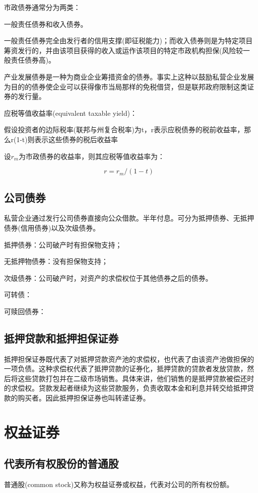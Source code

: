 \documentclass{article}
\begin{document}
市政债券通常分为两类：

一般责任债券和收入债券。

一般责任债券完全由发行者的信用支撑(即征税能力)；而收入债券则是为特定项目筹资发行的，并由该项目获得的收入或运作该项目的特定市政机构担保(风险较一般责任债券高)。

产业发展债券是一种为商业企业筹措资金的债券。事实上这种以鼓励私营企业发展为目的的债券使企业可以获得像市当局那样的免税借贷，但是联邦政府限制这类证券的发行量。

\hspace*{\fill}

应税等值收益率(equivalent taxable yield)：

假设投资者的边际税率(联邦与州复合税率)为t，r表示应税债券的税前收益率，那么r(1-t)则表示这些债券的税后收益率

设$ r_m $为市政债券的收益率，则其应税等值收益率为：

\[
r=r_m/(1-t)
\]

\subsection{公司债券}
私营企业通过发行公司债券直接向公众借款。半年付息。可分为抵押债券、无抵押债券(信用债券)以及次级债券。

抵押债券：公司破产时有担保物支持；

无抵押物债券：没有担保物支持；

次级债券：公司破产时，对资产的求偿权位于其他债券之后的债券。

可转债：

可赎回债券：

\subsection{抵押贷款和抵押担保证券}
抵押担保证券既代表了对抵押贷款资产池的求偿权，也代表了由该资产池做担保的一项负债。这种求偿权代表了抵押贷款的证券化，抵押贷款的贷款者发放贷款，然后将这些贷款打包并在二级市场销售。具体来讲，他们销售的是抵押贷款被偿还时的求偿权。贷款发起者继续为这些贷款服务，负责收取本金和利息并转交给抵押贷款的购买者。因此抵押担保证券也叫转递证券。

\section{权益证券}
\subsection{代表所有权股份的普通股}
普通股(common stock)又称为权益证券或权益，代表对公司的所有权份额。
\end{document}
